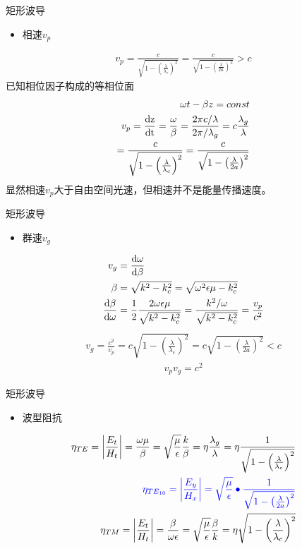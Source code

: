 \begin{frame}{矩形波导}
    \begin{itemize}
        \item 相速$v_p$
    \end{itemize}
    \begin{align}
        v_p=\frac{c}{\sqrt{1-\left(\frac{\lambda}{\lambda_c}\right)^2}}=\frac{c}{\sqrt{1-\left(\frac{\lambda}{2a}\right)^2}}>c
    \end{align}
    已知相位因子构成的等相位面
    \begin{align*}
        \omega t-\beta z=const \\
        v_p=\frac{\rm{d}z}{\rm{d}t}=\frac{\omega}{\beta}=\frac{2\pi c/\lambda}{2\pi/\lambda_g}=c\frac{\lambda_g}{\lambda} \\
           =\frac{c}{\sqrt{1-\left(\frac{\lambda}{\lambda_c}\right)^2}}=\frac{c}{\sqrt{1-\left(\frac{\lambda}{2a}\right)^2}} 
    \end{align*}
    显然相速$v_p$大于自由空间光速，但相速并不是能量传播速度。
\end{frame}

\begin{frame}{矩形波导}
    \begin{itemize}
        \item 群速$v_g$
    \end{itemize}
    \begin{align*}
        v_g&=\frac{\rm{d}\omega}{\rm{d}\beta}\\
        \beta &= \sqrt{k^2-k_c^2}=\sqrt{\omega^2\epsilon\mu-k_c^2}\\
        \frac{\rm{d}\beta}{\rm{d}\omega}&=\frac{1}{2}\frac{2\omega\epsilon\mu}{\sqrt{k^2-k_c^2}}=\frac{k^2/\omega}{\sqrt{k^2-k_c^2}}=\frac{v_p}{c^2}
    \end{align*}
    \begin{align}
        v_g = \frac{c^2}{v_p}=c\sqrt{1-\left(\frac{\lambda}{\lambda_c}\right)^2}=c\sqrt{1-\left(\frac{\lambda}{2a}\right)^2}<c
    \end{align}
    \begin{align}
        v_p v_g=c^2
    \end{align}
\end{frame}

\begin{frame}{矩形波导}
    \begin{itemize}
        \item 波型阻抗
    \end{itemize}
    \begin{align}
        \eta_{TE}=\left|\frac{E_t}{H_t}\right|=\frac{\omega\mu}{\beta}=\sqrt{\frac{\mu}{\epsilon}}\frac{k}{\beta}=\eta\frac{\lambda_g}{\lambda}=\eta\frac{1}{\sqrt{1-\left(\frac{\lambda}{\lambda_c}\right)^2}}\\
        \color{blue}{\eta_{TE_{10}}=\left|\frac{E_y}{H_x}\right|=\sqrt{\frac{\mu}{\epsilon}}\bullet\frac{1}{\sqrt{1-\left(\frac{\lambda}{2a}\right)^2}}}\\
        \eta_{TM}=\left|\frac{E_t}{H_t}\right|=\frac{\beta}{\omega\epsilon}=\sqrt{\frac{\mu}{\epsilon}}\frac{\beta}{k}=\eta\sqrt{1-\left(\frac{\lambda}{\lambda_c}\right)^2}
    \end{align}
\end{frame}

